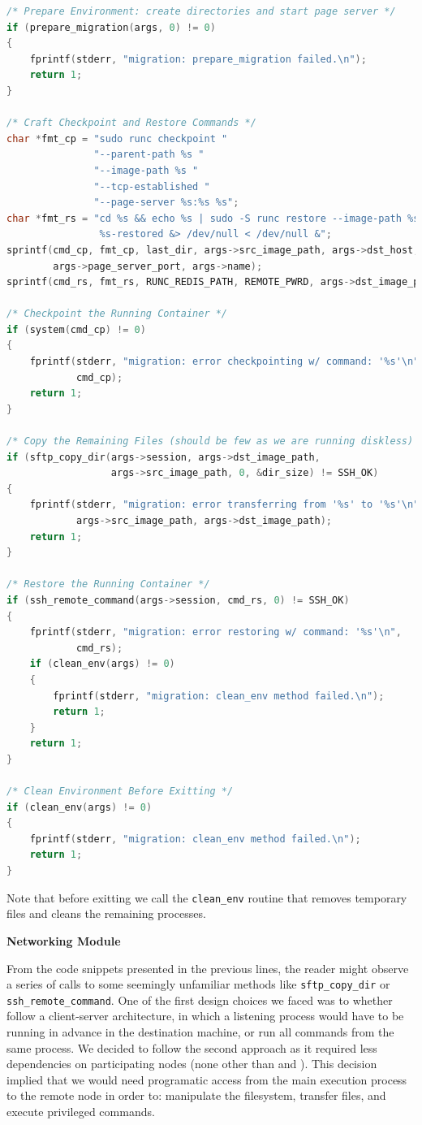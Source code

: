 \begin{lstlisting}[language=C,caption={Snippet for the last (stopping) checkpoint and remote restore.\label{code:last-cp}}]
/* Prepare Environment: create directories and start page server */
if (prepare_migration(args, 0) != 0)
{
    fprintf(stderr, "migration: prepare_migration failed.\n");
    return 1;
}

/* Craft Checkpoint and Restore Commands */
char *fmt_cp = "sudo runc checkpoint "
               "--parent-path %s "
               "--image-path %s "
               "--tcp-established "
               "--page-server %s:%s %s";
char *fmt_rs = "cd %s && echo %s | sudo -S runc restore --image-path %s \
                %s-restored &> /dev/null < /dev/null &";
sprintf(cmd_cp, fmt_cp, last_dir, args->src_image_path, args->dst_host,
        args->page_server_port, args->name);
sprintf(cmd_rs, fmt_rs, RUNC_REDIS_PATH, REMOTE_PWRD, args->dst_image_path, args->name);

/* Checkpoint the Running Container */
if (system(cmd_cp) != 0)
{
    fprintf(stderr, "migration: error checkpointing w/ command: '%s'\n",
            cmd_cp);
    return 1;
}

/* Copy the Remaining Files (should be few as we are running diskless) */
if (sftp_copy_dir(args->session, args->dst_image_path, 
                  args->src_image_path, 0, &dir_size) != SSH_OK)
{
    fprintf(stderr, "migration: error transferring from '%s' to '%s'\n",
            args->src_image_path, args->dst_image_path);
    return 1;
}

/* Restore the Running Container */
if (ssh_remote_command(args->session, cmd_rs, 0) != SSH_OK)
{
    fprintf(stderr, "migration: error restoring w/ command: '%s'\n",
            cmd_rs);
    if (clean_env(args) != 0)
    {
        fprintf(stderr, "migration: clean_env method failed.\n");
        return 1;
    }
    return 1;
}

/* Clean Environment Before Exitting */
if (clean_env(args) != 0)
{
    fprintf(stderr, "migration: clean_env method failed.\n");
    return 1;
}
\end{lstlisting}
Note that before exitting we call the \texttt{clean\_env} routine that removes temporary files and cleans the remaining processes.

\textbf{Networking Module}

From the code snippets presented in the previous lines, the reader might observe a series of calls to some seemingly unfamiliar methods like \texttt{sftp\_copy\_dir} or \texttt{ssh\_remote\_command}.
One of the first design choices we faced was to whether follow a client-server architecture, in which a listening process would have to be running in advance in the destination machine, or run all commands from the same process.
We decided to follow the second approach as it required less dependencies on participating nodes (none other than \criu and \runc).
This decision implied that we would need programatic access from the main execution process to the remote node in order to: manipulate the filesystem, transfer files, and execute privileged commands.

